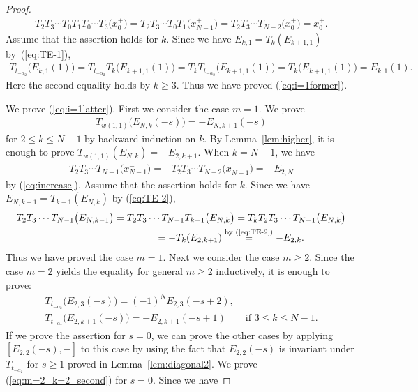 \documentclass[10pt,a4paper]{amsart}
\theoremstyle{definition}
\numberwithin{equation}{section}
\begin{document}
\begin{proof}
\begin{gather*}
T_2 T_3 \cdots T_0 T_1 T_0 \cdots T_3\big(x_0^+\big) = T_2 T_3 \cdots T_0 T_1 \big(x_{N-1}^+\big) = T_2 T_3 \cdots T_{N-2} \big(x_0^+\big) = x_0^+.
\end{gather*}
Assume that the assertion holds for $k$. Since we have $E_{k,1} = T_k(E_{k+1,1})$ by~(\ref{eq:TE-1}),
\begin{gather*}
T_{t_{-\alpha_2}}\big(E_{k,1}(1)\big) = T_{t_{-\alpha_2}} T_{k}\big(E_{k+1,1}(1)\big) = T_{k} T_{t_{-\alpha_2}}\big(E_{k+1,1}(1)\big) = T_k \big(E_{k+1,1}(1)\big) = E_{k,1}(1).
\end{gather*}
Here the second equality holds by $k \geq 3$. Thus we have proved (\ref{eq:i=1former}).

We prove (\ref{eq:i=1latter}). First we consider the case $m=1$. We prove
\begin{gather*}
T_{w(1,1)} \big(E_{N,k}(-s)\big)=-E_{N,k+1}(-s)
\end{gather*}
for $2 \leq k \leq N-1$ by backward induction on $k$. By Lemma~\ref{lem:higher}, it is enough to prove $T_{w(1,1)}(E_{N,k})=-E_{2,k+1}$. When $k=N-1$, we have
\begin{gather*}
T_2 T_3 \cdots T_{N-1}\big(x_{N-1}^-\big) = -T_2 T_3 \cdots T_{N-2}\big(x_{N-1}^+\big) = -E_{2,N}
\end{gather*}
by (\ref{eq:increase}). Assume that the assertion holds for $k$. Since we have $E_{N,k-1}=T_{k-1}(E_{N,k})$ by (\ref{eq:TE-2}),
\begin{gather*}
T_2 T_3 \cdots T_{N-1}\big(E_{N,k-1}\big) = T_2 T_3 \cdots T_{N-1} T_{k-1}\big(E_{N,k}\big) = T_k T_2 T_3 \cdots T_{N-1} \big(E_{N,k}\big)\\
\hphantom{T_2 T_3 \cdots T_{N-1}\big(E_{N,k-1}\big)}{} = -T_k(E_{2,k+1}) \overset{\text{by (\ref{eq:TE-2})}}{=} -E_{2,k}.
\end{gather*}
Thus we have proved the case $m=1$. Next we consider the case $m \geq 2$. Since the case $m=2$ yields the equality for general $m \geq 2$ inductively, it is enough to prove:
\begin{gather}
T_{t_{-\alpha_2}}\big(E_{2,3}(-s)\big) = (-1)^N E_{2,3}(-s+2), \label{eq:m=2_k=2_second}\\
T_{t_{-\alpha_2}}\big(E_{2,k+1}(-s)\big) = -E_{2,k+1}(-s+1) \qquad \text{if $3 \leq k \leq N-1$}. \label{eq:m=2_k+1_second}
\end{gather}
If we prove the assertion for $s=0$, we can prove the other cases by applying $[E_{2,2}(-s),-]$ to this case by using the fact that $E_{2,2}(-s)$ is invariant under $T_{t_{-\alpha_2}}$ for $s \geq 1$ proved in Lemma~\ref{lem:diagonal2}. We prove (\ref{eq:m=2_k=2_second}) for $s=0$. Since we have

\end{proof}
\end{document}
